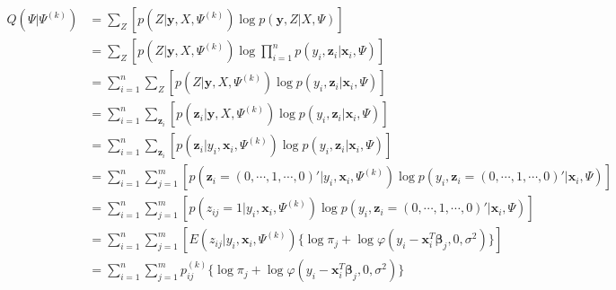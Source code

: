 \documentclass[]{book}
\theoremstyle{definition}
\theoremstyle{definition}
\theoremstyle{definition}
\theoremstyle{remark}
\begin{document}
\begin{align}
Q(\Psi|\Psi^{(k)}) & =\sum_{Z}\left[p(Z|\mathbf{y}, X, \Psi^{(k)})\log p(\mathbf{y}, Z|X, \Psi)\right]\\
                   & =\sum_{Z}\left[p(Z|\mathbf{y}, X, \Psi^{(k)})\log\prod^{n}_{i=1}p(y_{i}, \mathbf{z}_{i}|\mathbf{x}_{i}, \Psi)\right]\\
                   & =\sum^{n}_{i=1}\sum_{Z}\left[p(Z|\mathbf{y}, X, \Psi^{(k)})\log p(y_{i}, \mathbf{z}_{i}|\mathbf{x}_{i}, \Psi)\right]\\
                   & =\sum^{n}_{i=1}\sum_{\mathbf{z}_{i}}\left[p(\mathbf{z}_{i}|\mathbf{y}, X, \Psi^{(k)})\log p(y_{i}, \mathbf{z}_{i}|\mathbf{x}_{i}, \Psi)\right]\\
                   & =\sum^{n}_{i=1}\sum_{\mathbf{z}_{i}}\left[p(\mathbf{z}_{i}|y_{i}, \mathbf{x}_{i}, \Psi^{(k)})\log p(y_{i}, \mathbf{z}_{i}|\mathbf{x}_{i}, \Psi)\right]\\
                   & =\sum^{n}_{i=1}\sum^{m}_{j=1}\left[p(\mathbf{z}_{i}=(0,\cdots,1,\cdots,0)'|y_{i}, \mathbf{x}_{i}, \Psi^{(k)})\log p(y_{i}, \mathbf{z}_{i}=(0,\cdots,1,\cdots,0)'|\mathbf{x}_{i}, \Psi)\right]\\
                   & =\sum^{n}_{i=1}\sum^{m}_{j=1}\left[p(z_{ij}=1|y_{i}, \mathbf{x}_{i}, \Psi^{(k)})\log p(y_{i}, \mathbf{z}_{i}=(0,\cdots,1,\cdots,0)'|\mathbf{x}_{i}, \Psi)\right]\\
                   & =\sum^{n}_{i=1}\sum^{m}_{j=1}\left[E(z_{ij}|y_{i}, \mathbf{x}_{i}, \Psi^{(k)})\{\log\pi_{j}+\log\varphi(y_{i}-\mathbf{x}^{T}_{i}\boldsymbol{\beta}_{j}, 0, \sigma^{2})\}\right]\\
                   & =\sum^{n}_{i=1}\sum^{m}_{j=1}p^{(k)}_{ij}\{\log\pi_{j}+\log\varphi(y_{i}-\mathbf{x}^{T}_{i}\boldsymbol{\beta}_{j}, 0, \sigma^{2})\}
\end{align}
\end{document}

